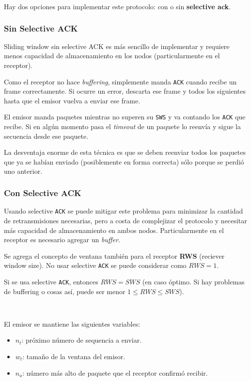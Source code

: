 \documentclass[]{article}
\begin{document}
Hay dos opciones para implementar este protocolo: con o sin \textbf{selective ack}.

\subsubsection{Sin Selective ACK}
Sliding window sin selective ACK es más sencillo de implementar y requiere menos capacidad de almacenamiento en los nodos (particularmente en el receptor).

Como el receptor no hace \emph{buffering}, simplemente manda \texttt{ACK} cuando recibe un frame correctamente. Si ocurre un error, descarta ese frame y todos los siguientes hasta que el emisor vuelva a enviar ese frame.

El emisor manda paquetes mientras no superen su \texttt{SWS} y va contando los \texttt{ACK} que recibe. Si en algún momento pasa el \emph{timeout} de un paquete lo reenvía y sigue la secuencia desde ese paquete.

La desventaja enorme de esta técnica es que se deben reenviar todos los paquetes que ya se habían enviado (posiblemente en forma correcta) sólo porque se perdió uno anterior.



\subsubsection{Con Selective ACK}
Usando selective \texttt{ACK} se puede mitigar este problema para minimizar la cantidad de retransmisiones necesarias, pero a costa de complejizar el protocolo y necesitar más capacidad de almacenamiento en ambos nodos. Particularmente en el receptor es necesario agregar un \emph{buffer}.


Se agrega el concepto de ventana también para el receptor \textbf{RWS} (reciever window size). No usar selective \texttt{ACK} se puede considerar como $RWS = 1$.

Si se usa selective \texttt{ACK}, entonces $RWS = SWS$ (en caso óptimo. Si hay problemas de buffering o cosas así, puede ser menor $1\leq RWS \leq SWS$).

~\newline

El emisor se mantiene las siguientes variables:
\begin{itemize}
    \item $n_t$: próximo número de sequencia a enviar.
    \item $w_t$: tamaño de la ventana del emisor.
    \item $n_a$: número más alto de paquete que el receptor confirmó recibir.
\end{itemize}
\end{document}
